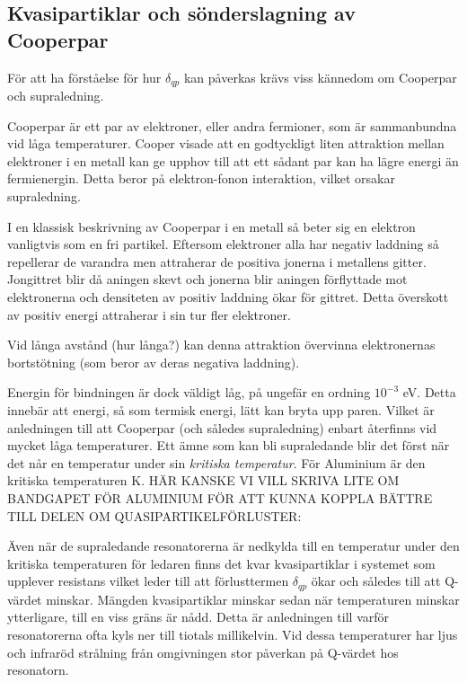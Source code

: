 \documentclass[main.tex]{subfiles}
\begin{document}
\subsection{Kvasipartiklar och sönderslagning av Cooperpar}
För att ha förståelse för hur $\delta_{qp}$ kan påverkas krävs viss kännedom om Cooperpar och supraledning.

Cooperpar är ett par av elektroner, eller andra fermioner, som är sammanbundna vid låga temperaturer. Cooper visade att en godtyckligt liten attraktion mellan elektroner i en metall kan ge upphov till att ett sådant par kan ha lägre energi än fermienergin. Detta beror på elektron-fonon interaktion, vilket orsakar supraledning.

I en klassisk beskrivning av Cooperpar i en metall så beter sig en elektron vanligtvis som en fri partikel. Eftersom elektroner alla har negativ laddning så repellerar de varandra men attraherar de positiva jonerna i metallens gitter. Jongittret blir då aningen skevt och jonerna blir aningen förflyttade mot elektronerna och densiteten av positiv laddning ökar för gittret. Detta överskott av positiv energi attraherar i sin tur fler elektroner. 

Vid långa avstånd (hur långa?) kan denna attraktion övervinna elektronernas bortstötning (som beror av  deras negativa laddning).

Energin för bindningen är dock väldigt låg, på ungefär en ordning $10^{-3}$ eV.\cite{placeholder} Detta innebär att energi, så som termisk energi, lätt kan bryta upp paren. Vilket är anledningen till att Cooperpar (och således supraledning) enbart återfinns vid mycket låga temperaturer. Ett ämne som kan bli supraledande blir det först när det når en temperatur under sin \emph{kritiska temperatur}. För Aluminium är den kritiska temperaturen \unit[1,2]{K}. HÄR KANSKE VI VILL SKRIVA LITE OM BANDGAPET FÖR ALUMINIUM FÖR ATT KUNNA KOPPLA BÄTTRE TILL DELEN OM QUASIPARTIKELFÖRLUSTER:





Även när de supraledande resonatorerna är nedkylda till en temperatur under den kritiska temperaturen för ledaren finns det kvar kvasipartiklar i systemet som upplever resistans vilket leder till att förlusttermen $\delta_{qp}$ ökar och således till att Q-värdet minskar. Mängden kvasipartiklar minskar sedan när temperaturen minskar ytterligare, till en viss gräns är nådd\cite{Barends2011}. Detta är anledningen till varför resonatorerna ofta kyls ner till tiotals millikelvin. Vid dessa temperaturer har ljus och infraröd strålning från omgivningen stor påverkan på Q-värdet hos resonatorn\cite{Barends2011}.
\end{document}
